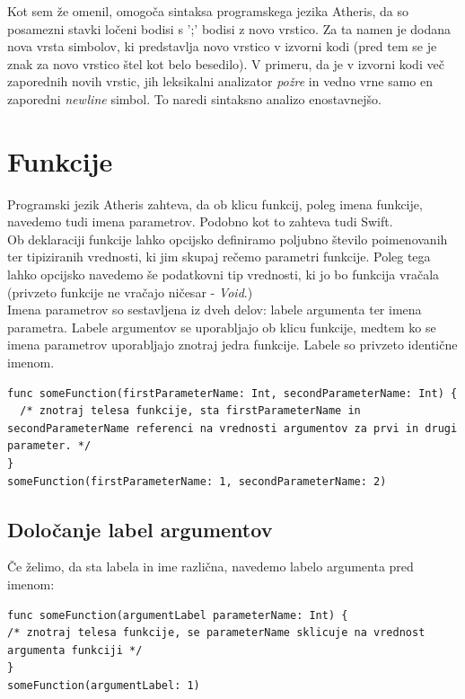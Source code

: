 \documentclass[a4paper, 12p]{book}
\begin{document}
Kot sem že omenil, omogoča sintaksa programskega jezika Atheris, da so posamezni stavki ločeni bodisi s ';' bodisi z novo vrstico. Za ta namen je dodana nova vrsta simbolov, ki predstavlja novo vrstico v izvorni kodi (pred tem se je znak za novo vrstico štel kot belo besedilo). V primeru, da je v izvorni kodi več zaporednih novih vrstic, jih leksikalni analizator \textit{požre} in vedno vrne samo en zaporedni \textit{newline} simbol. To naredi sintaksno analizo enostavnejšo. 

\section{Funkcije}

Programski jezik Atheris zahteva, da ob klicu funkcij, poleg imena funkcije, navedemo tudi imena parametrov. Podobno kot to zahteva tudi Swift. \\
\indent Ob deklaraciji funkcije lahko opcijsko definiramo poljubno število poimenovanih ter tipiziranih vrednosti, ki jim skupaj rečemo parametri funkcije. Poleg tega lahko opcijsko navedemo še podatkovni tip vrednosti, ki jo bo funkcija vračala (privzeto funkcije ne vračajo ničesar - \textit{Void}.) \\
\indent Imena parametrov so sestavljena iz dveh delov: labele argumenta ter imena parametra. Labele argumentov se uporabljajo ob klicu funkcije, medtem ko se imena parametrov uporabljajo znotraj jedra funkcije. Labele so privzeto identične imenom.

\begin{lstlisting}[caption={Primer definicije in klica funkcije.}, captionpos=b]
func someFunction(firstParameterName: Int, secondParameterName: Int) {
  /* znotraj telesa funkcije, sta firstParameterName in secondParameterName referenci na vrednosti argumentov za prvi in drugi parameter. */
}
someFunction(firstParameterName: 1, secondParameterName: 2)
\end{lstlisting}

\subsection{Določanje label argumentov}

Če želimo, da sta labela in ime različna, navedemo labelo argumenta pred imenom:

\begin{lstlisting}[caption={Labela argumenta in ime parametra se razlikujeta.}, captionpos=b]
func someFunction(argumentLabel parameterName: Int) {
/* znotraj telesa funkcije, se parameterName sklicuje na vrednost argumenta funkciji */
}
someFunction(argumentLabel: 1) 
\end{lstlisting}
\end{document}
